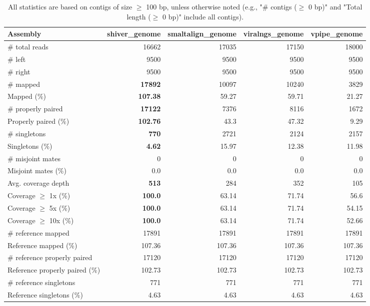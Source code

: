 \documentclass[12pt,a4paper]{article}
\begin{document}
\begin{table}[ht]
\begin{center}
\caption{All statistics are based on contigs of size $\geq$ 100 bp, unless otherwise noted (e.g., "\# contigs ($\geq$ 0 bp)" and "Total length ($\geq$ 0 bp)" include all contigs).}
\begin{tabular}{|l*{4}{|r}|}
\hline
Assembly & shiver\_genome & smaltalign\_genome & viralngs\_genome & vpipe\_genome \\ \hline
\# total reads & 16662 & 17035 & 17150 & 18000 \\ \hline
\# left & 9500 & 9500 & 9500 & 9500 \\ \hline
\# right & 9500 & 9500 & 9500 & 9500 \\ \hline
\# mapped & {\bf 17892} & 10097 & 10240 & 3829 \\ \hline
Mapped (\%) & {\bf 107.38} & 59.27 & 59.71 & 21.27 \\ \hline
\# properly paired & {\bf 17122} & 7376 & 8116 & 1672 \\ \hline
Properly paired (\%) & {\bf 102.76} & 43.3 & 47.32 & 9.29 \\ \hline
\# singletons & {\bf 770} & 2721 & 2124 & 2157 \\ \hline
Singletons (\%) & {\bf 4.62} & 15.97 & 12.38 & 11.98 \\ \hline
\# misjoint mates & 0 & 0 & 0 & 0 \\ \hline
Misjoint mates (\%) & 0.0 & 0.0 & 0.0 & 0.0 \\ \hline
Avg. coverage depth & {\bf 513} & 284 & 352 & 105 \\ \hline
Coverage $\geq$ 1x (\%) & {\bf 100.0} & 63.14 & 71.74 & 56.6 \\ \hline
Coverage $\geq$ 5x (\%) & {\bf 100.0} & 63.14 & 71.74 & 54.15 \\ \hline
Coverage $\geq$ 10x (\%) & {\bf 100.0} & 63.14 & 71.74 & 52.66 \\ \hline
\# reference mapped & 17891 & 17891 & 17891 & 17891 \\ \hline
Reference mapped (\%) & 107.36 & 107.36 & 107.36 & 107.36 \\ \hline
\# reference properly paired & 17120 & 17120 & 17120 & 17120 \\ \hline
Reference properly paired (\%) & 102.73 & 102.73 & 102.73 & 102.73 \\ \hline
\# reference singletons & 771 & 771 & 771 & 771 \\ \hline
Reference singletons (\%) & 4.63 & 4.63 & 4.63 & 4.63 \\ \hline

\end{tabular}
\end{center}
\end{table}
\end{document}

